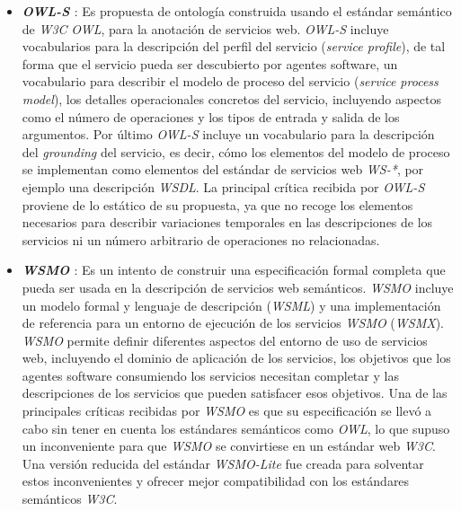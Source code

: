\begin{itemize}

\item \textbf{\textit{OWL-S} \cite{martin2004owl}}: Es propuesta de ontolog\'ia construida usando el est\'andar sem\'antico de \textit{W3C} \textit{OWL}, para la anotaci\'on de servicios web. \textit{OWL-S} incluye vocabularios para la descripci\'on del perfil del servicio (\textit{service profile}), de tal forma que el servicio pueda ser descubierto por agentes software, un vocabulario para describir el modelo de proceso del servicio (\textit{service process model}), los detalles operacionales concretos del servicio, incluyendo aspectos como el n\'umero de operaciones y los tipos de entrada y salida de los argumentos.  Por \'ultimo \textit{OWL-S} incluye un vocabulario para la descripci\'on del \textit{grounding} del servicio, es decir, c\'omo los elementos del modelo de proceso se implementan como elementos del est\'andar de servicios web \textit{WS-*}, por ejemplo una descripci\'on \textit{WSDL}. La principal cr\'itica recibida por \textit{OWL-S} proviene de lo est\'atico de su propuesta, ya que no recoge los elementos necesarios para describir variaciones temporales en las descripciones de los servicios ni un n\'umero arbitrario de operaciones no relacionadas.

\item \textbf{\textit{WSMO} \cite{wsmo}}: Es un intento de construir una especificaci\'on formal completa que pueda ser usada en la descripci\'on de servicios web sem\'anticos. \textit{WSMO} incluye un modelo formal y lenguaje de descripci\'on (\textit{WSML}) y una implementaci\'on de referencia para un entorno de ejecuci\'on de los servicios \textit{WSMO} (\textit{WSMX}). \textit{WSMO} permite definir diferentes aspectos del entorno de uso de servicios web, incluyendo el dominio de aplicaci\'on de los servicios, los objetivos que los agentes software consumiendo los servicios necesitan completar y las descripciones de los servicios que pueden satisfacer esos objetivos. Una de las principales cr\'iticas recibidas por \textit{WSMO} es que su especificaci\'on se llev\'o a cabo sin tener en cuenta los est\'andares sem\'anticos como \textit{OWL}, lo que supuso un inconveniente para que \textit{WSMO} se convirtiese en un est\'andar web \textit{W3C}. Una versi\'on reducida del est\'andar \textit{WSMO-Lite} \cite{wsmo_lite} fue creada para solventar estos inconvenientes y ofrecer mejor compatibilidad con los est\'andares sem\'anticos \textit{W3C}.


\end{itemize}
